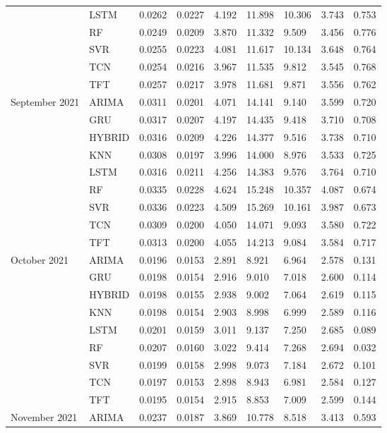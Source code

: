 \begin{tabular}{lllllllll}
 & LSTM & 0.0262 & 0.0227 & 4.192 & 11.898 & 10.306 & 3.743 & 0.753 \\
 & RF & 0.0249 & 0.0209 & 3.870 & 11.332 & 9.509 & 3.456 & 0.776 \\
 & SVR & 0.0255 & 0.0223 & 4.081 & 11.617 & 10.134 & 3.648 & 0.764 \\
 & TCN & 0.0254 & 0.0216 & 3.967 & 11.535 & 9.812 & 3.545 & 0.768 \\
 & TFT & 0.0257 & 0.0217 & 3.978 & 11.681 & 9.871 & 3.556 & 0.762 \\
September 2021 & ARIMA & 0.0311 & 0.0201 & 4.071 & 14.141 & 9.140 & 3.599 & 0.720 \\
 & GRU & 0.0317 & 0.0207 & 4.197 & 14.435 & 9.418 & 3.710 & 0.708 \\
 & HYBRID & 0.0316 & 0.0209 & 4.226 & 14.377 & 9.516 & 3.738 & 0.710 \\
 & KNN & 0.0308 & 0.0197 & 3.996 & 14.000 & 8.976 & 3.533 & 0.725 \\
 & LSTM & 0.0316 & 0.0211 & 4.256 & 14.383 & 9.576 & 3.764 & 0.710 \\
 & RF & 0.0335 & 0.0228 & 4.624 & 15.248 & 10.357 & 4.087 & 0.674 \\
 & SVR & 0.0336 & 0.0223 & 4.509 & 15.269 & 10.161 & 3.987 & 0.673 \\
 & TCN & 0.0309 & 0.0200 & 4.050 & 14.071 & 9.093 & 3.580 & 0.722 \\
 & TFT & 0.0313 & 0.0200 & 4.055 & 14.213 & 9.084 & 3.584 & 0.717 \\
October 2021 & ARIMA & 0.0196 & 0.0153 & 2.891 & 8.921 & 6.964 & 2.578 & 0.131 \\
 & GRU & 0.0198 & 0.0154 & 2.916 & 9.010 & 7.018 & 2.600 & 0.114 \\
 & HYBRID & 0.0198 & 0.0155 & 2.938 & 9.002 & 7.064 & 2.619 & 0.115 \\
 & KNN & 0.0198 & 0.0154 & 2.903 & 8.998 & 6.999 & 2.589 & 0.116 \\
 & LSTM & 0.0201 & 0.0159 & 3.011 & 9.137 & 7.250 & 2.685 & 0.089 \\
 & RF & 0.0207 & 0.0160 & 3.022 & 9.414 & 7.268 & 2.694 & 0.032 \\
 & SVR & 0.0199 & 0.0158 & 2.998 & 9.073 & 7.184 & 2.672 & 0.101 \\
 & TCN & 0.0197 & 0.0153 & 2.898 & 8.943 & 6.981 & 2.584 & 0.127 \\
 & TFT & 0.0195 & 0.0154 & 2.915 & 8.853 & 7.009 & 2.599 & 0.144 \\
November 2021 & ARIMA & 0.0237 & 0.0187 & 3.869 & 10.778 & 8.518 & 3.413 & 0.593 \\

\end{tabular}
